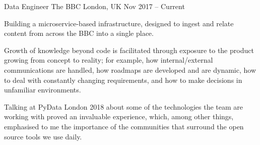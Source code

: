            \begin{cventries}
           
        \cventry
        {Data Engineer}
        {The BBC}
        {London, UK}
        {Nov 2017 – Current}

        {
            \begin{cvitems}
            
            \item{Building a microservice-based infrastructure, designed to ingest and relate content from across the BBC into a single place.
}
\item{Growth of knowledge beyond code is facilitated through exposure to the product growing from concept to reality; for example, how internal/external communications are handled, how roadmaps are developed and are dynamic, how to deal with constantly changing requirements, and how to make decisions in unfamiliar environments.
}
\item{Talking at PyData London 2018 about some of the technologies the team are working with proved an invaluable experience, which, among other things, emphasised to me the importance of the communities that surround the open source tools we use daily.
}
            
            \end{cvitems}
        }
        
           \end{cventries}
    